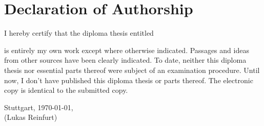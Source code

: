 \chapter*{Declaration of Authorship}

\noindent
I hereby certify that the diploma thesis entitled

\vspace{1em}

\textit{\thesistitle}

\vspace{1em}

\noindent
is entirely my own work except where otherwise indicated. Passages and ideas from other sources have been clearly indicated.
To date, neither this diploma thesis nor essential parts thereof were subject of an examination procedure.
Until now, I don't have published this diploma thesis or parts thereof.
The electronic copy is identical to the submitted copy.

\vspace{4em}

\noindent
Stuttgart, \today,\hspace{4em}\hdashrule[0.5ex][x]{8.5cm}{1pt}{1pt}\\
\phantom{Stuttgart, \today,}\hspace{4em}(Lukas Reinfurt)
